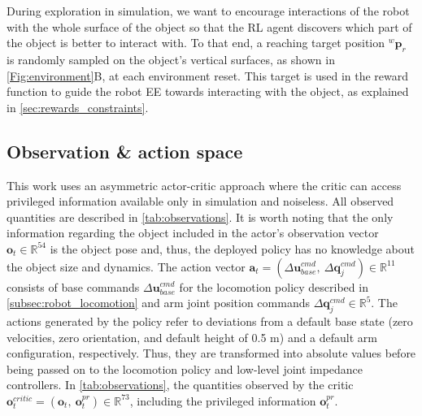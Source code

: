 During exploration in simulation, we want to encourage interactions of the robot with the whole surface of the object so that the RL agent discovers which part of the object is better to interact with. To that end, a reaching target position $^w\pmb p_r$ is randomly sampled on the object's vertical surfaces, as shown in \cref{Fig:environment}B, at each environment reset. This target is used in the reward function to guide the robot EE towards interacting with the object, as explained in \cref{sec:rewards_constraints}.

\subsection{Observation \& action space}
\label{sec:obsrevation_action}
This work uses an asymmetric actor-critic approach \cite{pinto2017asymmetric, ma2023learning} where the critic can access privileged information available only in simulation and noiseless. All observed quantities are described in \cref{tab:observations}. It is worth noting that the only information regarding the object included in the actor's observation vector $\pmb o_t \in \mathbb{R}^{54}$ is the object pose and, thus, the deployed policy has no knowledge about the object size and dynamics. The action vector $\pmb a_t = (\Delta \pmb u_{base}^{cmd}, \ \Delta \pmb q_j^{cmd}) \in \mathbb{R}^{11}$ consists of base commands $\Delta \pmb u_{base}^{cmd}$ for the locomotion policy described in \cref{subsec:robot_locomotion} and arm joint position commands $\Delta \pmb q_j^{cmd} \in \mathbb{R}^5$. The actions generated by the policy refer to deviations from a default base state (zero velocities, zero orientation, and default height of 0.5 m) and a default arm configuration, respectively. Thus, they are transformed into absolute values before being passed on to the locomotion policy and low-level joint impedance controllers. In \cref{tab:observations}, the quantities observed by the critic $\pmb o_t^{critic} = (\pmb o_t, \ \pmb o_t^{pr}) \in \mathbb{R}^{73}$, including the privileged information $ \pmb o_t^{pr}$.

